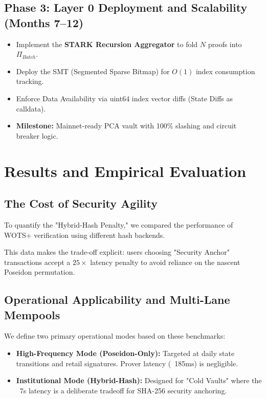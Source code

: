 \documentclass[conference]{IEEEtran}
\theoremstyle{definition}
\theoremstyle{plain}
\theoremstyle{remark}
\begin{document}
\subsection{Phase 3: Layer 0 Deployment and Scalability (Months 7--12)}
\begin{itemize}
\item Implement the \textbf{STARK Recursion Aggregator} to fold $N$ proofs into $\Pi_{Batch}$.
\item Deploy the SMT (Segmented Sparse Bitmap) for $O(1)$ index consumption tracking.
\item Enforce Data Availability via uint64 index vector diffs (State Diffs as calldata).
\item \textbf{Milestone:} Mainnet-ready PCA vault with 100\% slashing and circuit breaker logic.
\end{itemize}
\section{Results and Empirical Evaluation}
\label{sec:results}

\subsection{The Cost of Security Agility}
To quantify the "Hybrid-Hash Penalty," we compared the performance of WOTS+ verification using different hash backends.

\begin{table}[ht]
\centering
\caption{Cryptographic Backend Performance Comparison}
\label{tab:benchmarks}
\end{table}
This data makes the trade-off explicit: users choosing "Security Anchor" transactions accept a $25\times$ latency penalty to avoid reliance on the nascent Poseidon permutation.

\subsection{Operational Applicability and Multi-Lane Mempools}
We define two primary operational modes based on these benchmarks:
\begin{itemize}
    \item \textbf{High-Frequency Mode (Poseidon-Only):} Targeted at daily state transitions and retail signatures. Prover latency (~185ms) is negligible.
    \item \textbf{Institutional Mode (Hybrid-Hash):} Designed for "Cold Vaults" where the ~7s latency is a deliberate tradeoff for SHA-256 security anchoring.
\end{itemize}
\end{document}
